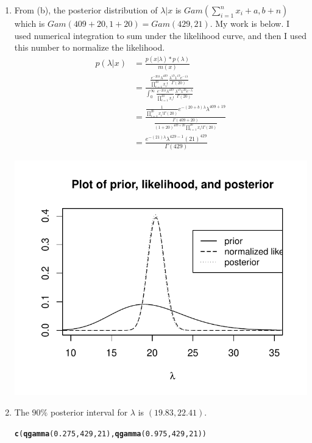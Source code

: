 \documentclass[12pt]{article}\usepackage[]{graphicx}\usepackage[]{color}
\makeatletter
\newcommand{\hlnum}[1]{\textcolor[rgb]{0.686,0.059,0.569}{#1}}%
\newcommand{\hlstd}[1]{\textcolor[rgb]{0.345,0.345,0.345}{#1}}%
\newcommand{\hlkwd}[1]{\textcolor[rgb]{0.737,0.353,0.396}{\textbf{#1}}}%
\newenvironment{kframe}{%
 \def\at@end@of@kframe{}%
 \ifinner\ifhmode%
  \def\at@end@of@kframe{\end{minipage}}%
  \begin{minipage}{\columnwidth}%
 \fi\fi%
 \def\FrameCommand##1{\hskip\@totalleftmargin \hskip-\fboxsep
 \colorbox{shadecolor}{##1}\hskip-\fboxsep
     \hskip-\linewidth \hskip-\@totalleftmargin \hskip\columnwidth}%
 \MakeFramed {\advance\hsize-\width
   \@totalleftmargin\z@ \linewidth\hsize
   \@setminipage}}%
 {\par\unskip\endMakeFramed%
 \at@end@of@kframe}
\newenvironment{knitrout}{}{} %
\makeatother
\begin{document}
\begin{doublespacing}
\begin{enumerate}
\begin{enumerate}
\begin{center}
\begin{knitrout}
\end{knitrout}
\end{center}

\item From (b), the posterior distribution of $\lambda|x$ is $Gam(\sum_{i=1}^nx_i+a, b+n)$ which is $Gam(409+20, 1+20)=Gam(429, 21)$. My work is below. I used numerical integration to sum under the likelihood curve, and then I used this number to normalize the likelihood.
\begin{align*}
p(\lambda|x) &= \frac{p(x|\lambda)*p(\lambda)}{m(x)} \\
&= \frac{\frac{e^{-20\lambda}\lambda^{409}}{\prod_{i=1}^{20}x_i!}\frac{\lambda^{19}1^19e^{-1\lambda}}{\Gamma(20)}}{\int_0^{\infty}\frac{e^{-20\lambda}\lambda^{409}}{\prod_{i=1}^{20}x_i!}\frac{\lambda^{19}1^{20}e^{-\lambda}}{\Gamma(20)}} \\
&= \frac{\frac{1}{\prod_{i=1}^{20}x_i!\Gamma(20)}e^{-(20+b)\lambda}\lambda^{409+19}}{\frac{\Gamma(409+20)}{(1+20)^{409+20}\prod_{i=1}^{20}x_i!\Gamma(20)}} \\
&= \frac{e^{-(21)\lambda}\lambda^{429-1}(21)^{429}}{\Gamma(429)}
\end{align*}

\begin{center}
\begin{knitrout}\footnotesize
{}\color{fgcolor}
\includegraphics[width=0.7\linewidth]{figure/plotall-1} 

\end{knitrout}
\end{center}

\item The $90\%$ posterior interval for $\lambda$ is $(19.83, 22.41)$.
\begin{knitrout}\footnotesize
{}\color{fgcolor}\begin{kframe}
\begin{alltt}
\hlkwd{c}\hlstd{(}\hlkwd{qgamma}\hlstd{(}\hlnum{0.275}\hlstd{,} \hlnum{429}\hlstd{,} \hlnum{21}\hlstd{),} \hlkwd{qgamma}\hlstd{(}\hlnum{0.975}\hlstd{,} \hlnum{429}\hlstd{,} \hlnum{21}\hlstd{))}
\end{alltt}
\end{kframe}
\end{knitrout}


\end{enumerate}
\end{enumerate}
\end{doublespacing}
\end{document}
